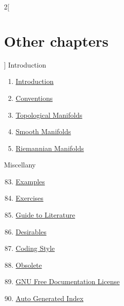 \begin{multicols}{2}[\section{Other chapters}]
\noindent
Introduction
\begin{enumerate}
\item \hyperref[introduction-section-phantom]{Introduction}
\item \hyperref[conventions-section-phantom]{Conventions}
\item \hyperref[topological-manifolds-section-phantom]{Topological Manifolds}
\item \hyperref[smooth-manifolds-section-phantom]{Smooth Manifolds}
\item \hyperref[riemannian-manifolds-section-phantom]{Riemannian Manifolds}
\end{enumerate}
Miscellany
\begin{enumerate}
\setcounter{enumi}{82}
\item \hyperref[examples-section-phantom]{Examples}
\item \hyperref[exercises-section-phantom]{Exercises}
\item \hyperref[guide-section-phantom]{Guide to Literature}
\item \hyperref[desirables-section-phantom]{Desirables}
\item \hyperref[coding-section-phantom]{Coding Style}
\item \hyperref[obsolete-section-phantom]{Obsolete}
\item \hyperref[fdl-section-phantom]{GNU Free Documentation License}
\item \hyperref[index-section-phantom]{Auto Generated Index}
\end{enumerate}
\end{multicols}
